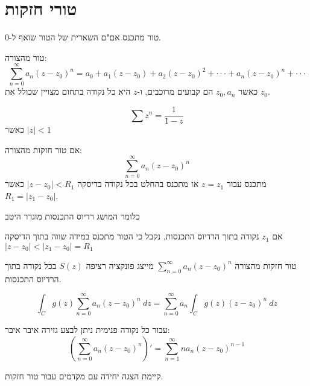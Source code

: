 \documentclass{tstextbook}
\begin{document}
\section{טורי חזקות}

\begin{proposition}
טור מתכנס אם"ם השארית של הטור שואף ל-0.

\end{proposition}
\begin{definition}
טור מהצורה:
$$\sum_{n=0}^{\infty}a_{n}(z-z_{0})^{n}=a_{0}+a_{1}(z-z_{0})+a_{2}(z-z_{0})^{2}+\cdot\cdot\cdot+a_{n}(z-z_{0})^{n}+\cdot\cdot\cdot$$
כאשר \(z_{0},a_{n}\) הם קבועים מרוכבים, ו-\(z\) היא כל נקודה בתחום מצויין שכולל את \(z_{0}\).

\end{definition}
\begin{proposition}
$$\sum z^{n}={\frac{1}{1-z}}$$
כאשר \(|z|<1\)

\end{proposition}
\begin{proposition}
אם טור חזקות מהצורה:
$$\sum_{n=0}^{\infty}a_{n}(z-z_{0})^{n}$$
מתכנס עבור \(z=z_{1}\) אז מתכנס בהחלט בכל נקודה בדיסקה \(|z-z_{0}|<R_{1}\) כאשר \(R_{1}=|z_{1}-z_{0}|\).

\end{proposition}
כלומר המושג רדיוס התכנסות מוגדר היטב

\begin{proposition}
אם \(z_{1}\) נקודה בתוך הרדיוס התכנסות, נקבל כי הטור מתכנס במידה שווה בתוך הדיסקה \(|z-z_{0}|<|z_{1}-z_{0}|=R_{1}\)

\end{proposition}
\begin{proposition}
טור חזקות מהצורה \(\sum_{n=0}^{\infty}a_{n}(z-z_{0})^{n}\) מייצג פונקציה רציפה \(S(z)\) בכל נקודה בתוך הרדיוס התכנסות.

\end{proposition}
\begin{proposition}
$$\int_{C}g(z)\sum_{n=0}^{\infty}a_{n}(z-z_{0})^{n}\ d z=\sum_{n=0}^{\infty}a_{n}\int_{C}g(z)(z-z_{0})^{n}\ d z$$

\end{proposition}
\begin{proposition}
עבור כל נקודה פנימית ניתן לבצע גזירה איבר איבר:
$$\left( \sum_{n=0}^{\infty}a_{n}(z-z_{0})^{n} \right)'=\sum_{n=1}^{\infty}n a_{n}(z-z_{0})^{n-1}$$

\end{proposition}
\begin{proposition}
קיימת הצגה יחידה עם מקדמים עבור טור חזקות.

\end{proposition}
\end{document}
